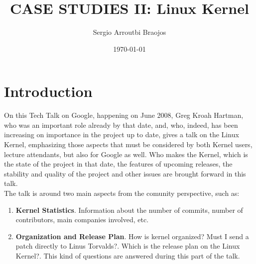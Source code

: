 \documentclass[11pt]{article}
\title{\textbf{CASE STUDIES II: Linux Kernel}}
\author{Sergio Arroutbi Braojos}
\date{\today}
\begin{document}
\maketitle

\section{Introduction}
On this Tech Talk on Google, happening on June 2008, Greg Kroah Hartman, who was an important role already by that date, and, who, indeed, has been increasing on importance in the project up to date, gives a talk on the Linux Kernel, emphasizing those aspects that must be considered by both Kernel users, lecture attendants, but also for Google as well. Who makes the Kernel, which is the state of the project in that date, the features of upcoming releases, the stability and quality of the project and other issues are brought forward in this talk.\\
The talk is around two main aspects from the comunity perspective, such as:
\begin{enumerate}
\item{\textbf{Kernel Statistics}}. Information about the number of commits, number of contributors, main companies involved, etc. 
\item{\textbf{Organization and Release Plan}}. How is kernel organized? Must I send a patch directly to Linus Torvalds?. Which is the release plan on the Linux Kernel?. This kind of questions are answered during this part of the talk.
\end{enumerate}
\end{document}
